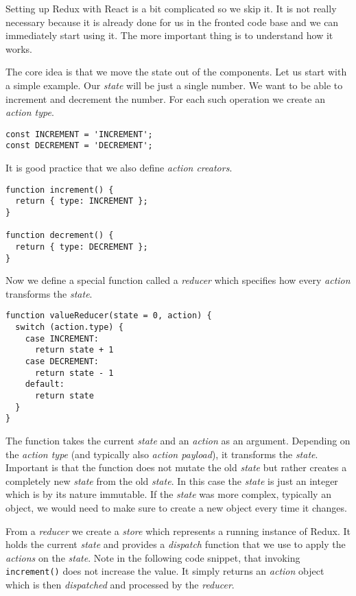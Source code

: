 Setting up Redux with React is a bit complicated so we skip it. It is not really necessary because it is already done for us in the fronted code base and we can immediately start using it. The more important thing is to understand how it works.

The core idea is that we move the state out of the components. Let us start with a simple example. Our \emph{state} will be just a single number. We want to be able to increment and decrement the number. For each such operation we create an \emph{action type}.

\begin{verbatim}
const INCREMENT = 'INCREMENT';
const DECREMENT = 'DECREMENT';
\end{verbatim}

It is good practice that we also define \emph{action creators}.

\begin{verbatim}
function increment() {
  return { type: INCREMENT };
}

function decrement() {
  return { type: DECREMENT };
}
\end{verbatim}

Now we define a special function called a \emph{reducer} which specifies how every \emph{action} transforms the \emph{state}.

\begin{verbatim}
function valueReducer(state = 0, action) {
  switch (action.type) {
    case INCREMENT:
      return state + 1
    case DECREMENT:
      return state - 1
    default:
      return state
  }
}
\end{verbatim}

The function takes the current \emph{state} and an \emph{action} as an argument. Depending on the \emph{action type} (and typically also \emph{action payload}), it transforms the \emph{state}. Important is that the function does not mutate the old \emph{state} but rather creates a completely new \emph{state} from the old \emph{state}. In this case the \emph{state} is just an integer which is by its nature immutable. If the \emph{state} was more complex, typically an object, we would need to make sure to create a new object  every time it changes.

From a \emph{reducer} we create a \emph{store} which represents a running instance of Redux. It holds the current \emph{state} and provides a \emph{dispatch} function that we use to apply the \emph{actions} on the \emph{state}. Note in the following code snippet, that invoking \texttt{increment()} does not increase the value. It simply returns an \emph{action} object which is then \emph{dispatched} and processed by the \emph{reducer}.

